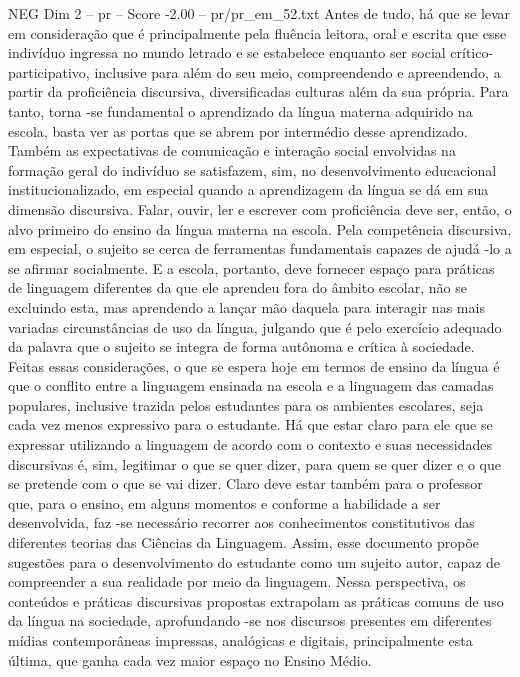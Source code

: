 \begin{textsample}{NEG Dim 2 – pr – Score -2.00 – pr/pr\_em\_52.txt}
Antes de tudo, há que se levar em consideração que é principalmente pela fluência leitora, oral e escrita que esse indivíduo ingressa no mundo letrado e se estabelece enquanto ser social crítico-participativo, inclusive para além do seu meio, compreendendo e apreendendo, a partir da proficiência discursiva, diversificadas culturas além da sua própria.
Para tanto, torna -se fundamental o aprendizado da língua materna adquirido na escola, basta ver as portas que se abrem por intermédio desse aprendizado.
Também as expectativas de comunicação e interação social envolvidas na formação geral do indivíduo se satisfazem, sim, no desenvolvimento educacional institucionalizado, em especial quando a aprendizagem da língua se dá em sua dimensão discursiva.
Falar, ouvir, ler e escrever com proficiência deve ser, então, o alvo primeiro do ensino da língua materna na escola.
Pela competência discursiva, em especial, o sujeito se cerca de ferramentas fundamentais capazes de ajudá -lo a se afirmar socialmente.
E a escola, portanto, deve fornecer espaço para práticas de linguagem diferentes da que ele aprendeu fora do âmbito escolar, não se excluindo esta, mas aprendendo a lançar mão daquela para interagir nas mais variadas circunstâncias de uso da língua, julgando que é pelo exercício adequado da palavra que o sujeito se integra de forma autônoma e crítica à sociedade.
Feitas essas considerações, o que se espera hoje em termos de ensino da língua é que o conflito entre a linguagem ensinada na escola e a linguagem das camadas populares, inclusive trazida pelos estudantes para os ambientes escolares, seja cada vez menos expressivo para o estudante.
Há que estar claro para ele que se expressar utilizando a linguagem de acordo com o contexto e suas necessidades discursivas é, sim, legitimar o que se quer dizer, para quem se quer dizer e o que se pretende com o que se vai dizer.
Claro deve estar também para o professor que, para o ensino, em alguns momentos e conforme a habilidade a ser desenvolvida, faz -se necessário recorrer aos conhecimentos constitutivos das diferentes teorias das Ciências da Linguagem.
Assim, esse documento propõe sugestões para o desenvolvimento do estudante como um sujeito autor, capaz de compreender a sua realidade por meio da linguagem.
Nessa perspectiva, os conteúdos e práticas discursivas propostas extrapolam as práticas comuns de uso da língua na sociedade, aprofundando -se nos discursos presentes em diferentes mídias contemporâneas impressas, analógicas e digitais, principalmente esta última, que ganha cada vez maior espaço no Ensino Médio.

\end{textsample}
